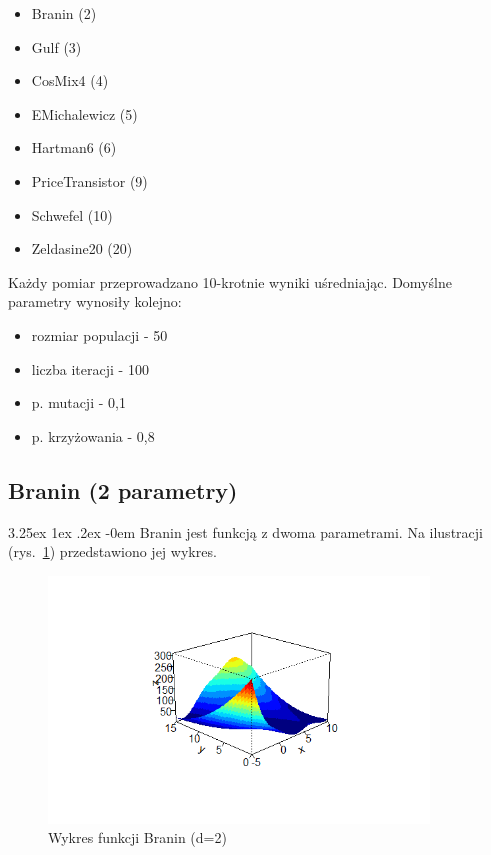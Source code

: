 \documentclass[11pt, a4paper]{article}
\makeatletter
\newcommand{\fbi}{\leavevmode{\parindent=1em\indent}}
\renewcommand\paragraph{\@startsection{paragraph}{5}{\z@}%
  {3.25ex \@plus1ex \@minus.2ex}%
  {-0em}%
  {\normalfont\normalsize\bfseries}}
\makeatother
\begin{document}
\begin{itemize}
	\item Branin (2)
	\item Gulf (3)
	\item CosMix4 (4)
	\item EMichalewicz (5)
	\item Hartman6 (6)
	\item PriceTransistor (9)
	\item Schwefel (10)
	\item Zeldasine20 (20)
\end{itemize}

\fbi
Każdy pomiar przeprowadzano 10-krotnie wyniki uśredniając. Domyślne parametry wynosiły kolejno:

\begin{itemize}
	\item rozmiar populacji - 50
	\item liczba iteracji - 100
	\item p. mutacji - 0,1
	\item p. krzyżowania - 0,8
\end{itemize}


\subsection{Branin (2 parametry)}
\paragraph{}
Branin jest funkcją z dwoma parametrami. Na ilustracji (rys.~\ref{fig:branin1}) przedstawiono jej wykres.

\begin{figure}[H]
	\begin{center}
		\includegraphics[width=0.9\textwidth]{./assets/branin1.png} %
		\caption{Wykres funkcji Branin (d=2)}
		\label{fig:branin1}
	\end{center}
\end{figure}
\end{document}
